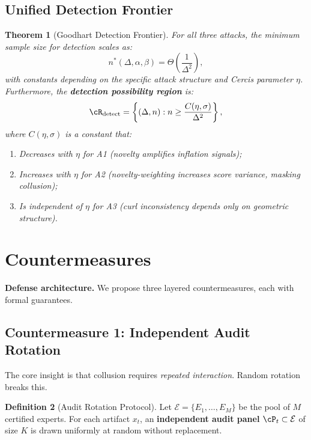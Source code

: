 \documentclass[11pt,a4paper]{article}
\theoremstyle{plain}
\newtheorem{theorem}{Theorem}[section]
\theoremstyle{definition}
\newtheorem{definition}[theorem]{Definition}
\theoremstyle{remark}
\newcommand{\cE}{\mathcal{E}}
\begin{document}
\subsection{Unified Detection Frontier}
\label{sec:frontier}
\begin{theorem}[Goodhart Detection Frontier]\label{thm:frontier}
  For all three attacks, the minimum sample size for detection scales as:
  \begin{equation}\label{eq:unified_frontier}
    n^*(\Delta, \alpha, \beta) = \Theta\left(\frac{1}{\Delta^2}\right),
  \end{equation}
  with constants depending on the specific attack structure and Cercis parameter \(\eta\).
  Furthermore, the \textbf{detection possibility region} is:
  \[ \cR_{\text{detect}} = \left\{ (\Delta, n) : n \geq \frac{C(\eta, \sigma)}{\Delta^2} \right\}, \]
  where \(C(\eta, \sigma)\) is a constant that:
  \begin{enumerate}[label=(\roman*)]
    \item \emph{Decreases} with \(\eta\) for A1 (novelty amplifies inflation signals);
    \item \emph{Increases} with \(\eta\) for A2 (novelty-weighting increases score variance, masking collusion);
    \item \emph{Is independent} of \(\eta\) for A3 (curl inconsistency depends only on geometric structure).
  \end{enumerate}
\end{theorem}

\section{Countermeasures}
\label{sec:defense}
\noindent
\textbf{Defense architecture.} We propose three layered countermeasures, each with formal guarantees.

\subsection{Countermeasure 1: Independent Audit Rotation}
The core insight is that collusion requires \emph{repeated interaction}. Random rotation breaks this.

\begin{definition}[Audit Rotation Protocol]\label{def:rotation}
  Let \(\cE = \{E_1, \dots, E_M\}\) be the pool of \(M\) certified experts. For each
  artifact \(x_t\), an \textbf{independent audit panel} \(\cP_t \subset \cE\) of size \(K\)
  is drawn uniformly at random without replacement.
\end{definition}
\end{document}

